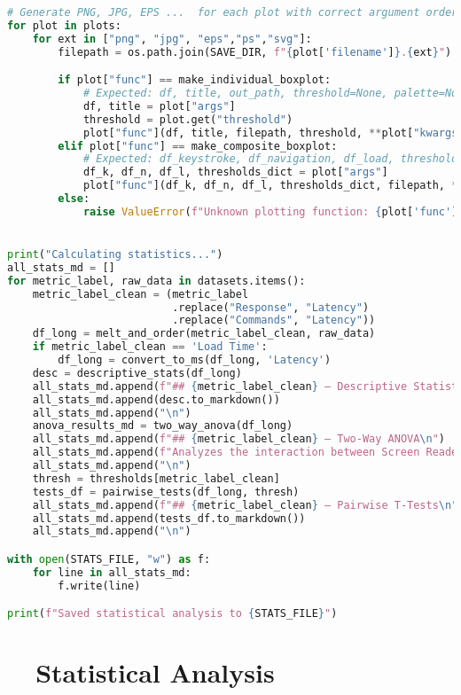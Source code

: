 \begin{lstlisting}[language=Python]
# Generate PNG, JPG, EPS ...  for each plot with correct argument ordering
for plot in plots:
    for ext in ["png", "jpg", "eps","ps","svg"]:
        filepath = os.path.join(SAVE_DIR, f"{plot['filename']}.{ext}")

        if plot["func"] == make_individual_boxplot:
            # Expected: df, title, out_path, threshold=None, palette=None
            df, title = plot["args"]
            threshold = plot.get("threshold")
            plot["func"](df, title, filepath, threshold, **plot["kwargs"])
        elif plot["func"] == make_composite_boxplot:
            # Expected: df_keystroke, df_navigation, df_load, thresholds_dict, out_path, palette=None
            df_k, df_n, df_l, thresholds_dict = plot["args"]
            plot["func"](df_k, df_n, df_l, thresholds_dict, filepath, **plot["kwargs"])
        else:
            raise ValueError(f"Unknown plotting function: {plot['func']}")


print("Calculating statistics...")
all_stats_md = []
for metric_label, raw_data in datasets.items():
    metric_label_clean = (metric_label
                          .replace("Response", "Latency")
                          .replace("Commands", "Latency"))
    df_long = melt_and_order(metric_label_clean, raw_data)
    if metric_label_clean == 'Load Time':
        df_long = convert_to_ms(df_long, 'Latency')
    desc = descriptive_stats(df_long)
    all_stats_md.append(f"## {metric_label_clean} — Descriptive Statistics\n")
    all_stats_md.append(desc.to_markdown())
    all_stats_md.append("\n")
    anova_results_md = two_way_anova(df_long)
    all_stats_md.append(f"## {metric_label_clean} — Two-Way ANOVA\n")
    all_stats_md.append(f"Analyzes the interaction between Screen Reader and RAM.\n\n{anova_results_md}\n")
    all_stats_md.append("\n")
    thresh = thresholds[metric_label_clean]
    tests_df = pairwise_tests(df_long, thresh)
    all_stats_md.append(f"## {metric_label_clean} — Pairwise T-Tests\n")
    all_stats_md.append(tests_df.to_markdown())
    all_stats_md.append("\n")

with open(STATS_FILE, "w") as f:
    for line in all_stats_md:
        f.write(line)

print(f"Saved statistical analysis to {STATS_FILE}")


\end{lstlisting}

\section{~~Statistical Analysis}
